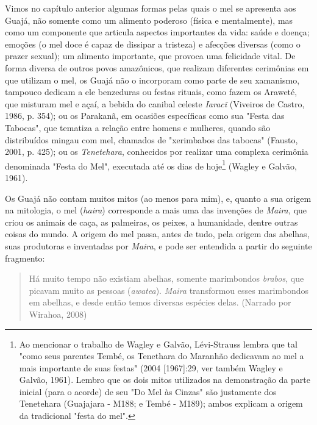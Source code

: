 Vimos no capítulo anterior algumas formas pelas quais o mel se apresenta
aos Guajá, não somente como um alimento poderoso (física e mentalmente),
mas como um componente que articula aspectos importantes da vida: saúde
e doença; emoções (o mel doce é capaz de dissipar a tristeza) e afecções
diversas (como o prazer sexual); um alimento importante, que provoca uma
felicidade vital. De forma diversa de outros povos amazônicos, que
realizam diferentes cerimônias em que utilizam o mel, os Guajá não o
incorporam como parte de seu xamanismo, tampouco dedicam a ele
benzeduras ou festas rituais, como fazem os Araweté, que misturam mel e
açaí, a bebida do canibal celeste \emph{Iaracĩ} (Viveiros de Castro,
1986, p. 354); ou os Parakanã, em ocasiões específicas como sua "Festa
das Tabocas", que tematiza a relação entre homens e mulheres, quando são
distribuídos mingau com mel, chamados de "xerimbabos das tabocas"
(Fausto, 2001, p. 425); ou os \emph{Tenetehara}, conhecidos por realizar
uma complexa cerimônia denominada "Festa do Mel", executada até os dias
de hoje\footnote{Ao mencionar o trabalho de Wagley e Galvão,
  Lévi-Strauss lembra que tal "como seus parentes Tembé, os Tenethara do
  Maranhão dedicavam ao mel a mais importante de suas festas" (2004
  {[}1967{]}:29, ver também Wagley e Galvão, 1961). Lembro que os dois
  mitos utilizados na demonstração da parte inicial (para o acorde) de
  seu "Do Mel às Cinzas" são justamente dos Tenetehara (Guajajara -
  M188; e Tembé - M189); ambos explicam a origem da tradicional "festa
  do mel".} (Wagley e Galvão, 1961).

Os Guajá não contam muitos mitos (ao menos para mim), e, quanto a sua
origem na mitologia, o mel (\emph{haira}) corresponde a mais uma das
invenções de \emph{Maira,} que criou os animais de caça, as palmeiras,
os peixes, a humanidade, dentre outras coisas do mundo. A origem do mel
passa, antes de tudo, pela origem das abelhas, suas produtoras e
inventadas por \emph{Maira}, e pode ser entendida a partir do seguinte
fragmento:

\begin{quote}
Há muito tempo não existiam abelhas, somente marimbondos \emph{brabos},
que picavam muito as pessoas (\emph{awatea}). \emph{Maira} transformou
esses marimbondos em abelhas, e desde então temos diversas espécies
delas. (Narrado por Wirahoa, 2008)
\end{quote}


